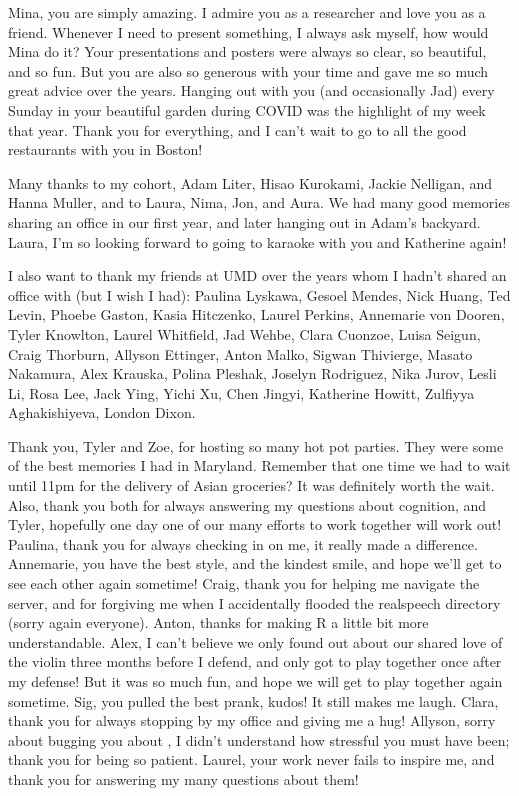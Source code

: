 Mina, you are simply amazing. I admire you as a researcher and love you as a friend. Whenever I need to present something, I always ask myself, how would Mina do it? Your presentations and posters were always so clear, so beautiful, and so fun. But you are also so generous with your time and gave me so much great advice over the years. Hanging out with you (and occasionally Jad) every Sunday in your beautiful garden during COVID was the highlight of my week that year. Thank you for everything, and I can’t wait to go to all the good restaurants with you in Boston!
 
Many thanks to my cohort, Adam Liter, Hisao Kurokami, Jackie Nelligan, and Hanna Muller, and to Laura, Nima, Jon, and Aura. We had many good memories sharing an office in our first year, and later hanging out in Adam’s backyard. Laura, I’m so looking forward to going to karaoke with you and Katherine again!
 
I also want to thank my friends at UMD over the years whom I hadn’t shared an office with (but I wish I had): Paulina Lyskawa, Gesoel Mendes, Nick Huang, Ted Levin, Phoebe Gaston, Kasia Hitczenko, Laurel Perkins, Annemarie von Dooren, Tyler Knowlton, Laurel Whitfield, Jad Wehbe, Clara Cuonzoe, Luisa Seigun, Craig Thorburn, Allyson Ettinger, Anton Malko, Sigwan Thivierge, Masato Nakamura, Alex Krauska, Polina Pleshak, Joselyn Rodriguez, Nika Jurov, Lesli Li, Rosa Lee, Jack Ying, Yichi Xu, Chen Jingyi, Katherine Howitt, Zulfiyya Aghakishiyeva, London Dixon.
 
Thank you, Tyler and Zoe, for hosting so many hot pot parties. They were some of the best memories I had in Maryland. Remember that one time we had to wait until 11pm for the delivery of Asian groceries? It was definitely worth the wait. Also, thank you both for always answering my questions about cognition, and Tyler, hopefully one day one of our many efforts to work together will work out! Paulina, thank you for always checking in on me, it really made a difference. Annemarie, you have the best style, and the kindest smile, and hope we’ll get to see each other again sometime! Craig, thank you for helping me navigate the server, and for forgiving me when I accidentally flooded the \textsf{realspeech} directory (sorry again everyone). Anton, thanks for making R a little bit more understandable. Alex, I can’t believe we only found out about our shared love of the violin three months before I defend, and only got to play together once after my defense! But it was so much fun, and hope we will get to play together again sometime. Sig, you pulled the best prank, kudos! It still makes me laugh. Clara, thank you for always stopping by my office and giving me a hug! Allyson, sorry about bugging you about , I didn’t understand how stressful you must have been; thank you for being so patient. Laurel, your work never fails to inspire me, and thank you for answering my many questions about them!
 

